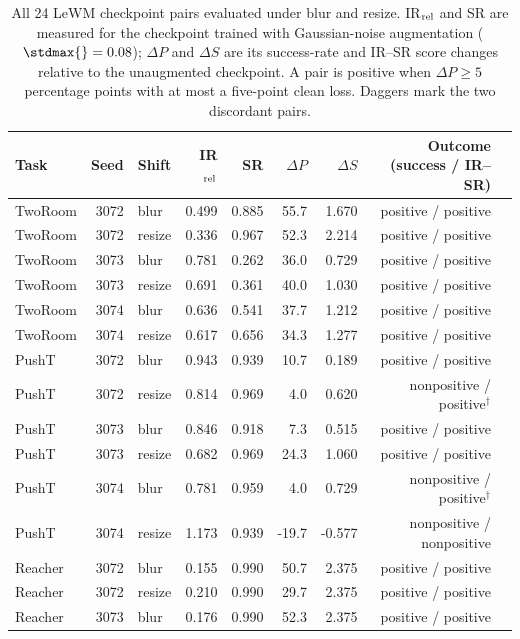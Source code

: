 \begin{table}[t]
\centering
\caption{All 24 LeWM checkpoint pairs evaluated under blur and resize. IR$_{\rm rel}$ and SR are measured for the checkpoint trained with Gaussian-noise augmentation ($\stdmax{}=0.08$); $\Delta P$ and $\Delta S$ are its success-rate and IR--SR score changes relative to the unaugmented checkpoint. A pair is positive when $\Delta P\geq5$ percentage points with at most a five-point clean loss. Daggers mark the two discordant pairs.}
\label{tab:cross-stressor-ir-sr-all-pairs}
\footnotesize
\setlength{\tabcolsep}{3pt}
\begin{tabular}{lrlrrrrrl}
\toprule
Task & Seed & Shift & IR$_{\rm rel}$ & SR & $\Delta P$ & $\Delta S$ & Outcome (success / IR--SR) \\
\midrule
TwoRoom & 3072 & blur & 0.499 & 0.885 & 55.7 & 1.670 & positive / positive \\
TwoRoom & 3072 & resize & 0.336 & 0.967 & 52.3 & 2.214 & positive / positive \\
TwoRoom & 3073 & blur & 0.781 & 0.262 & 36.0 & 0.729 & positive / positive \\
TwoRoom & 3073 & resize & 0.691 & 0.361 & 40.0 & 1.030 & positive / positive \\
TwoRoom & 3074 & blur & 0.636 & 0.541 & 37.7 & 1.212 & positive / positive \\
TwoRoom & 3074 & resize & 0.617 & 0.656 & 34.3 & 1.277 & positive / positive \\
PushT & 3072 & blur & 0.943 & 0.939 & 10.7 & 0.189 & positive / positive \\
PushT & 3072 & resize & 0.814 & 0.969 & 4.0 & 0.620 & nonpositive / positive$^\dag$ \\
PushT & 3073 & blur & 0.846 & 0.918 & 7.3 & 0.515 & positive / positive \\
PushT & 3073 & resize & 0.682 & 0.969 & 24.3 & 1.060 & positive / positive \\
PushT & 3074 & blur & 0.781 & 0.959 & 4.0 & 0.729 & nonpositive / positive$^\dag$ \\
PushT & 3074 & resize & 1.173 & 0.939 & -19.7 & -0.577 & nonpositive / nonpositive \\
Reacher & 3072 & blur & 0.155 & 0.990 & 50.7 & 2.375 & positive / positive \\
Reacher & 3072 & resize & 0.210 & 0.990 & 29.7 & 2.375 & positive / positive \\
Reacher & 3073 & blur & 0.176 & 0.990 & 52.3 & 2.375 & positive / positive \\

\end{tabular}
\end{table}
